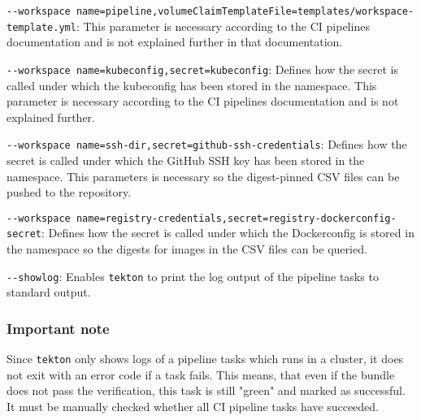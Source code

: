 \verb|--workspace name=pipeline,volumeClaimTemplateFile=templates/workspace-template.yml|: This parameter is necessary according to the CI pipelines documentation and is not explained further in that documentation.

\verb|--workspace name=kubeconfig,secret=kubeconfig|: Defines how the secret is called under which the kubeconfig has been stored in the namespace.
This parameter is necessary according to the CI pipelines documentation and is not explained further.

\verb|--workspace name=ssh-dir,secret=github-ssh-credentials|: Defines how the secret is called under which the GitHub SSH key has been stored in the namespace.
This parameters is necessary so the digest-pinned CSV files can be pushed to the repository.

\verb|--workspace name=registry-credentials,secret=registry-dockerconfig-secret|: Defines how the secret is called under which the Dockerconfig is stored in the namespace so the digests for images in the CSV files can be queried.

\verb|--showlog|: Enables \verb|tekton| to print the log output of the pipeline tasks to standard output.

\subsubsection{Important note}\label{subsubsec:test-redhat-marketplace-important-note}

Since \verb|tekton| only shows logs of a pipeline tasks which runs in a cluster, it does not exit with an error code if a task fails.
This means, that even if the bundle does not pass the verification, this task is still "green" and marked as successful.
It must be manually checked whether all CI pipeline tasks have succeeded.
